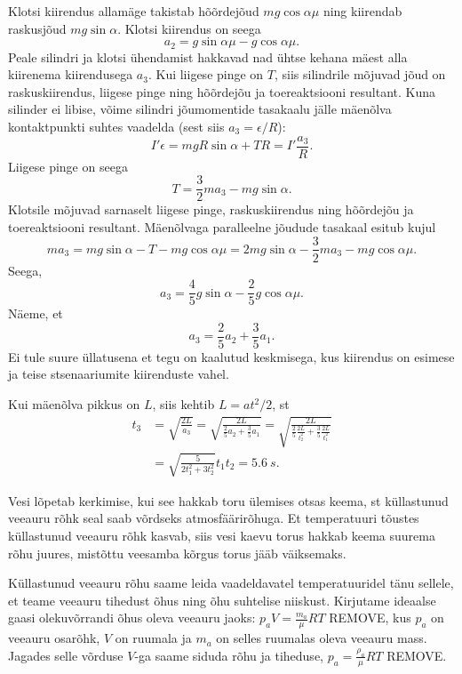 \documentclass[10pt]{article}
\newcommand{\p}[1]{REMOVE}
\begin{document}
Klotsi kiirendus allamäge takistab hõõrdejõud $mg\cos\alpha \mu$ ning kiirendab raskusjõud $mg\sin\alpha$. Klotsi kiirendus on seega
\[
a_2 = g\sin\alpha\mu - g\cos\alpha\mu.
\]
Peale silindri ja klotsi ühendamist hakkavad nad ühtse kehana mäest alla kiirenema kiirendusega $a_3$. Kui liigese pinge on $T$, siis silindrile mõjuvad jõud on raskuskiirendus, liigese pinge ning hõõrdejõu ja toereaktsiooni resultant. Kuna silinder ei libise, võime silindri jõumomentide tasakaalu jälle mäenõlva kontaktpunkti suhtes vaadelda (sest siis $a_3 = \epsilon / R$):
\[
I'\epsilon = mgR\sin\alpha + TR = I'\frac{a_3}{R}.
\]
Liigese pinge on seega
\[
T = \frac{3}{2}ma_3 - mg\sin\alpha.
\]
Klotsile mõjuvad sarnaselt liigese pinge, raskuskiirendus ning hõõrdejõu ja toereaktsiooni resultant. Mäenõlvaga paralleelne jõudude tasakaal esitub kujul
\[
ma_3 = mg\sin\alpha - T - mg\cos\alpha\mu = 2mg\sin\alpha - \frac{3}{2}ma_3 - mg\cos\alpha\mu.
\]
Seega,
\[
a_3 = \frac{4}{5}g\sin\alpha - \frac{2}{5}g\cos\alpha\mu.
\]
Näeme, et
\[
a_3 = \frac{2}{5}a_2 + \frac{3}{5}a_1.
\]
Ei tule suure üllatusena et tegu on kaalutud keskmisega, kus kiirendus on esimese ja teise stsenaariumite kiirenduste vahel.

Kui mäenõlva pikkus on $L$, siis kehtib $L = at^2/2$, st
\begin{align*}
t_3 &= \sqrt{\frac{2L}{a_3}} = \sqrt{\frac{2L}{\frac{2}{5}a_2 + \frac{3}{5}a_1}} = \sqrt{\frac{2L}{\frac{2}{5}\frac{2L}{t_2^2} + \frac{3}{5}\frac{2L}{t_1^2}}}\\
&= \sqrt{\frac{5}{2t_1^2+3t_2^2}}t_1t_2 = \SI{5.6}{s}.
\end{align*}
\probend
\bigskip


\solu
Vesi lõpetab kerkimise, kui see hakkab toru ülemises otsas keema, st küllastunud veeauru rõhk seal saab võrdseks atmosfäärirõhuga. Et temperatuuri tõustes küllastunud veeauru rõhk kasvab, siis vesi kaevu torus hakkab keema suurema rõhu juures, mistõttu veesamba kõrgus torus jääb väiksemaks.

Küllastunud veeauru rõhu saame leida vaadeldavatel temperatuuridel tänu sellele, et teame veeauru tihedust õhus ning õhu suhtelise niiskust. Kirjutame ideaalse gaasi olekuvõrrandi õhus oleva veeauru jaoks: $p_aV=\frac {m_a}\mu RT$ \p{1}, kus $p_a$ on veeauru osarõhk, $V$ on ruumala ja $m_a$ on selles ruumalas oleva veeauru mass. Jagades selle võrduse $V$-ga saame siduda rõhu ja tiheduse, $p_a=\frac {\rho_a}\mu RT$ \p{1}.
\end{document}
